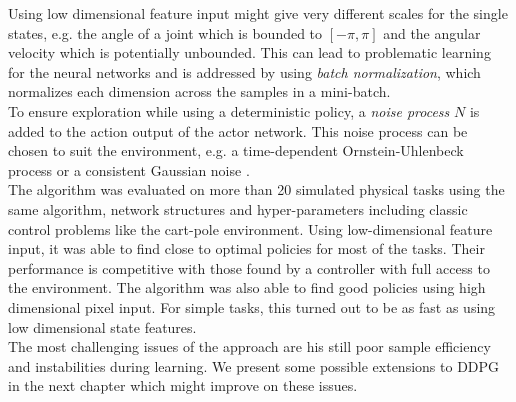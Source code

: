 Using low dimensional feature input might give very different scales for the single states, e.g. the angle of a joint which is bounded to $[-\pi, \pi]$ and the angular velocity which is potentially unbounded. This can lead to problematic learning for the neural networks and is addressed by using \textit{batch normalization}, which normalizes each dimension across the samples in a mini-batch.\\
To ensure exploration while using a deterministic policy, a \textit{noise process} $\mathit{N}$ is added to the action output of the actor network. This noise process can be chosen to suit the environment, e.g. a time-dependent Ornstein-Uhlenbeck process \citep{ricciardi1979ornstein} or a consistent Gaussian noise \citep{barth2018distributed}.\\
The algorithm was evaluated on more than 20 simulated physical tasks using the same algorithm, network structures and hyper-parameters including classic control problems like the cart-pole environment. Using low-dimensional feature input, it was able to find close to optimal policies for most of the tasks. Their performance is competitive with those found by a controller with full access to the environment. The algorithm was also able to find good policies using high dimensional pixel input. For simple tasks, this turned out to be as fast as using low dimensional state features.\\
The most challenging issues of the approach are his still poor sample efficiency and instabilities during learning. We present some possible extensions to DDPG in the next chapter which might improve on these issues.
